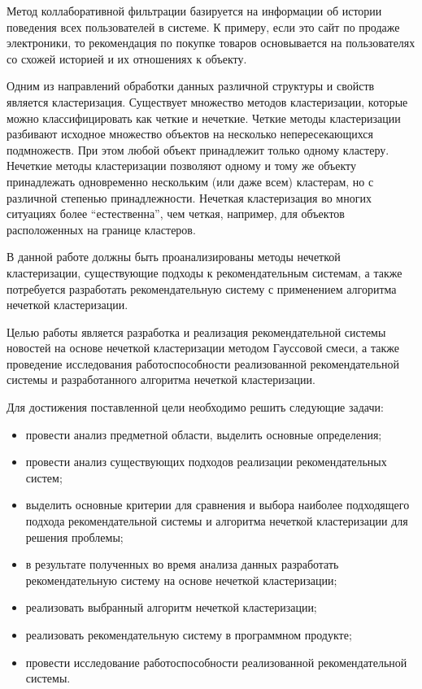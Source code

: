 Метод коллаборативной фильтрации базируется на информации об истории поведения всех пользователей в системе. К примеру, если это сайт по продаже электроники, то рекомендация по покупке товаров основывается на пользователях со схожей историей и их отношениях к объекту.

Одним из направлений обработки данных различной структуры и свойств является кластеризация. Существует множество методов кластеризации, которые можно классифицировать как четкие и нечеткие. Четкие методы кластеризации разбивают исходное множество объектов на несколько непересекающихся подмножеств. При этом любой объект принадлежит только одному кластеру. Нечеткие методы кластеризации позволяют одному и тому же объекту принадлежать одновременно нескольким (или даже всем) кластерам, но с различной степенью принадлежности. Нечеткая кластеризация во многих ситуациях более “естественна”, чем четкая, например, для объектов расположенных на границе кластеров.

В данной работе должны быть проанализированы методы нечеткой кластеризации, существующие подходы к рекомендательным системам, а также потребуется разработать рекомендательную систему с применением алгоритма нечеткой кластеризации.

Целью работы является разработка и реализация рекомендательной системы новостей на основе нечеткой кластеризации методом Гауссовой смеси, а также проведение исследования работоспособности реализованной рекомендательной системы и разработанного алгоритма нечеткой кластеризации.

Для достижения поставленной цели необходимо решить следующие задачи:
\begin{itemize}
	\item провести анализ предметной области, выделить основные определения;
	\item провести анализ существующих подходов реализации рекомендательных
	систем;
	\item выделить основные критерии для сравнения и выбора наиболее
	подходящего подхода рекомендательной системы и алгоритма нечеткой
	кластеризации для решения проблемы;
	\item в результате полученных во время анализа данных разработать рекомендательную систему на основе нечеткой кластеризации;
	\item реализовать выбранный алгоритм нечеткой кластеризации;
	\item реализовать рекомендательную систему в программном продукте;
	\item провести исследование работоспособности реализованной рекомендательной системы.
\end{itemize}

\pagebreak